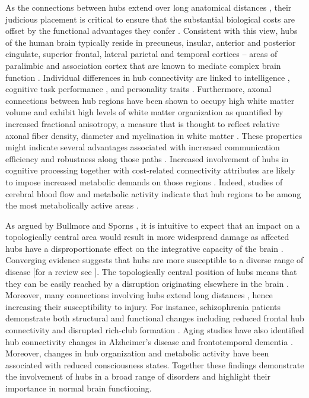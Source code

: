 As the connections between hubs extend over long anatomical distances \citep{Fulcher2016,Towlson2013,VandenHeuvel2011}, their judicious placement is critical to ensure that the substantial biological costs are offset by the functional advantages they confer \citep{DeReus2014,Towlson2013}. Consistent with this view, hubs of the human brain typically reside in precuneus, insular, anterior and posterior cingulate, superior frontal, lateral parietal and temporal cortices \citep{Gong2009,VandenHeuvel2012,VandenHeuvel2013a} -- areas of paralimbic and association cortex that are known to mediate complex brain function \citep{Buckner2009,Mesulam1998}. Individual differences in hub connectivity are linked to intelligence \citep{Li2009,VandenHeuvel2009}, cognitive task performance \citep{Cole2012}, and personality traits \citep{Adelstein2011}. Furthermore, axonal connections between hub regions have been shown to occupy high white matter volume and exhibit high levels of white matter organization as quantified by increased fractional anisotropy, a measure that is thought to reflect relative axonal fiber density, diameter and myelination in white matter \citep{Collin2014}. These properties might indicate several advantages associated with increased communication efficiency and robustness along those paths \citep{Collin2014}. Increased involvement of hubs in cognitive processing \citep{Buckner2009,Cole2012,Mesulam1998} together with cost-related connectivity attributes are likely to impose increased metabolic demands on those regions \citep{Collin2014}. Indeed, studies of cerebral blood flow and metabolic activity indicate that hub regions to be among the most metabolically active areas \citep{Vaishnavi2010,Varkuti2011}.

As argued by Bullmore and Sporns \citep{Bullmore2012}, it is intuitive to expect that an impact on a topologically central area would result in more widespread damage as affected hubs have a disproportionate effect on the integrative capacity of the brain \citep{DeReus2014}. Converging evidence suggests that hubs are more susceptible to a diverse range of disease [for a review see \citet{Bassett2009a,Crossley2014,Fornito2015}]. The topologically central position of hubs means that they can be easily reached by a disruption originating elsewhere in the brain \citep{Zhou2012}. Moreover, many connections involving hubs extend long distances \citep{VandenHeuvel2012}, hence increasing their susceptibility to injury. For instance, schizophrenia patients demonstrate both structural and functional changes including reduced frontal hub connectivity \citep{Fornito2012a,VandenHeuvel2010,Zalesky2011} and disrupted rich-club formation \citep{VandenHeuvel2013c}. Aging studies have also identified hub connectivity changes in Alzheimer’s disease \citep{DeHaan2012,Stam2009} and frontotemporal dementia \citep{Agosta2013}. Moreover, changes in hub organization \citep{Achard2012} and metabolic activity \citep{Laureys2004} have been associated with reduced consciousness states. Together these findings demonstrate the involvement of hubs in a broad range of disorders and highlight their importance in normal brain functioning.

